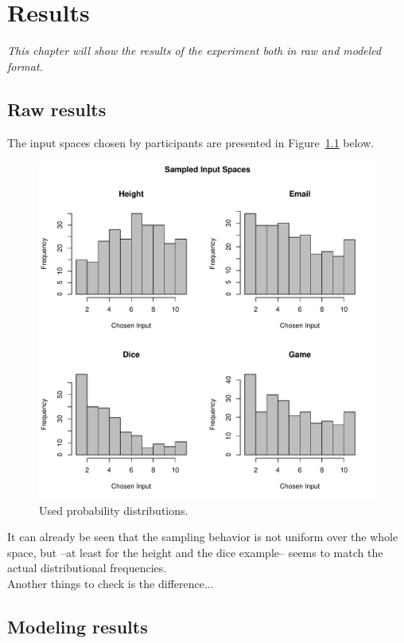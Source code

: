 \documentclass[oneside, 11pt]{book}
\begin{document}
\chapter{Results}
\emph{This chapter will show the results of the experiment both in raw and modeled format.}
\section{Raw results}
The input spaces chosen by participants are presented in Figure~\ref{raw} below.
\begin{figure}[h!]
\caption{Used probability distributions.}
\label{raw}
  \centering
    \includegraphics[scale=0.68]{rawsample.pdf}
\end{figure}
It can already be seen that the sampling behavior is not uniform over the whole space, but --at least for the height and the dice example-- seems to match the actual distributional frequencies.\\
Another things to check is the difference...
\section{Modeling results}
\end{document}
